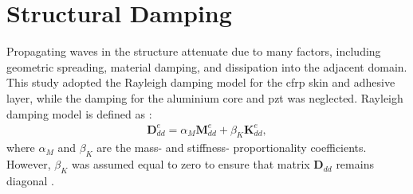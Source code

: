 \section{Structural Damping}
\label{sec:damping}

Propagating waves in the structure attenuate due to many factors, including geometric spreading, material damping, and dissipation into the adjacent domain.
This study adopted the Rayleigh damping model for the \ac{cfrp} skin and adhesive layer, while the damping for the aluminium core and \ac{pzt} was neglected.
Rayleigh damping model is defined as \cite{wandowski2017guided}:
\begin{eqnarray}
	\textbf{D}_{dd}^e = \alpha_M \textbf{M}_{dd}^e + \beta_K \textbf{K}_{dd}^e,
	\label{eq:damping}
\end{eqnarray}
where \(\alpha_M\) and \(\beta_K\) are the mass- and stiffness- proportionality coefficients. However, \(\beta_K\) was assumed equal to zero to ensure that matrix \(\textbf{D}_{dd}\) remains diagonal \cite{schulte2011simulation, wandowski2017guided}.